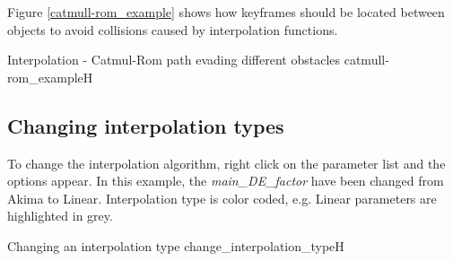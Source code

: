 Figure \ref{catmull-rom_example} shows how keyframes should be located between objects to avoid collisions caused by interpolation functions.

{Interpolation - Catmul-Rom path evading different obstacles}
{catmull-rom_example}{H}

\subsection{Changing interpolation types}\label{changing-interpolation-types}

To change the interpolation algorithm, right click on the parameter list and the
options appear. In this example, the \emph{main\_DE\_factor} have been
changed from Akima to Linear. Interpolation type is color coded, e.g. Linear
parameters are highlighted in grey.

{Changing an interpolation type}
{change_interpolation_type}{H}
